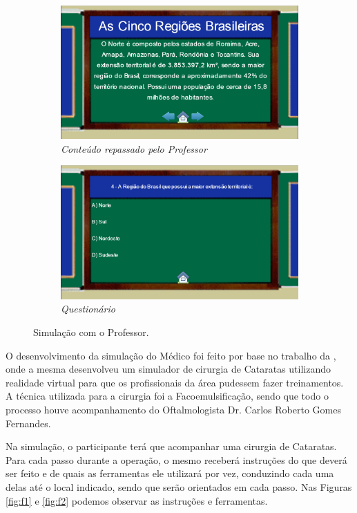 \documentclass[
	12pt,				%
    oneside,			%
	a4paper,			%
	english,			%
	french,				%
	spanish,			%
	brazil,				%
	]{abntex2}
\begin{document}
\begin{figure}[H]
  \begin{subfigure}[b]{0.5\textwidth}
    \includegraphics[width=\textwidth]{Norte.PNG}
    \caption{\textit{Conteúdo repassado pelo Professor}}
    \label{fig:Norte}
  \end{subfigure}
  \hfill
  \begin{subfigure}[b]{0.5\textwidth}
    \includegraphics[width=\textwidth]{Q2.PNG}
    \caption{\textit{Questionário}}
    \label{fig:Q2}
  \end{subfigure}
  \caption{Simulação com o Professor.}
\end{figure}

O desenvolvimento da simulação do Médico foi feito por base no trabalho da , onde a mesma desenvolveu um simulador de cirurgia de Cataratas utilizando realidade virtual para que os profissionais da área pudessem fazer treinamentos. A técnica utilizada para a cirurgia foi a Facoemulsificação, sendo que todo o processo houve acompanhamento do Oftalmologista Dr. Carlos Roberto Gomes Fernandes.

Na simulação, o participante terá que acompanhar uma cirurgia de Cataratas. Para cada passo durante a operação, o mesmo receberá instruções do que deverá ser feito e de quais as ferramentas ele utilizará por vez, conduzindo cada uma delas até o local indicado, sendo que serão orientados em cada passo. Nas Figuras \ref{fig:f1} e \ref{fig:f2} podemos observar as instruções e ferramentas.
\end{document}
